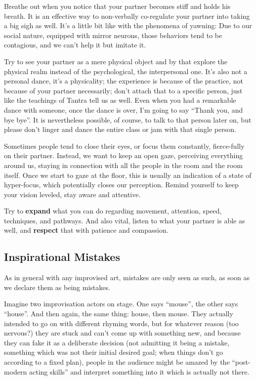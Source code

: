 Breathe out when you notice that your partner becomes stiff and holds his breath.
It is an effective way to non-verbally co-regulate your partner into taking a big sigh as well.
It's a little bit like with the phenomena of yawning: Due to our social nature, equipped with mirror neurons, those behaviors tend to be contagious, and we can't help it but imitate it.

Try to see your partner as a mere physical object and by that explore the physical realm instead of the psychological, the interpersonal one.
It's also not a personal dance, it's a physicality; the experience is because of the practice, not because of your partner necessarily; don't attach that to a specific person, just like the teachings of Tantra tell us as well.
Even when you had a remarkable dance with someone, once the dance is over, I'm going to say ``Thank you, and bye bye''.
It is nevertheless possible, of course, to talk to that person later on, but please don't linger and dance the entire class or jam with that single person.

Sometimes people tend to close their eyes, or focus them constantly, fierce-fully on their partner.
Instead, we want to keep an open gaze, perceiving everything around us, staying in connection with all the people in the room and the room itself.
Once we start to gaze at the floor, this is usually an indication of a state of hyper-focus, which potentially closes our perception.
Remind yourself to keep your vision leveled, stay aware and attentive.

Try to \textbf{expand} what you can do regarding movement, attention, speed, techniques, and pathways.
And also vital, listen to what your partner is able as well, and \textbf{respect} that with patience and compassion.

\subsection{Inspirational Mistakes}\label{subsec:inspirational-mistakes}

As in general with any improvised art, mistakes are only seen as such, as soon as we declare them as being mistakes.

Imagine two improvisation actors on stage.
One says ``mouse'', the other says ``house''.
And then again, the same thing: house, then mouse.
They actually intended to go on with different rhyming words, but for whatever reason (too nervous?) they are stuck and can't come up with something new, and because they can fake it as a deliberate decision (not admitting it being a mistake, something which was not their initial desired goal; when things don't go according to a fixed plan), people in the audience might be amazed by the ``post-modern acting skills'' and interpret something into it which is actually not there.

